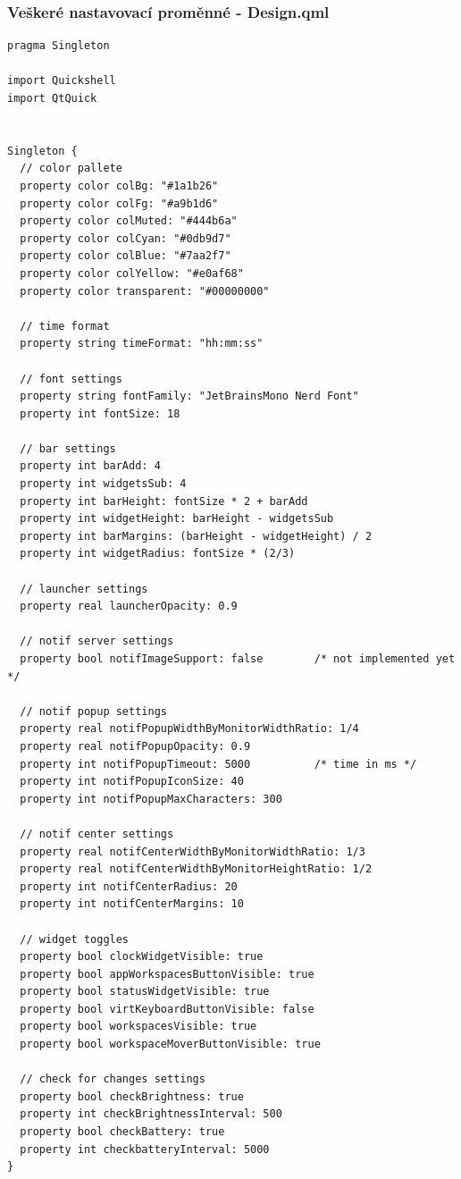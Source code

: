 \documentclass[12pt,a4paper]{article}
\begin{document}
\subsubsection{Veškeré nastavovací proměnné - Design.qml}
\label{Design.qml 0}
\begin{lstlisting}
pragma Singleton

import Quickshell
import QtQuick 


Singleton {
  // color pallete
  property color colBg: "#1a1b26"
  property color colFg: "#a9b1d6"
  property color colMuted: "#444b6a"
  property color colCyan: "#0db9d7"
  property color colBlue: "#7aa2f7"
  property color colYellow: "#e0af68"
  property color transparent: "#00000000"

  // time format
  property string timeFormat: "hh:mm:ss"

  // font settings
  property string fontFamily: "JetBrainsMono Nerd Font"
  property int fontSize: 18

  // bar settings
  property int barAdd: 4
  property int widgetsSub: 4
  property int barHeight: fontSize * 2 + barAdd
  property int widgetHeight: barHeight - widgetsSub
  property int barMargins: (barHeight - widgetHeight) / 2
  property int widgetRadius: fontSize * (2/3)

  // launcher settings
  property real launcherOpacity: 0.9

  // notif server settings
  property bool notifImageSupport: false        /* not implemented yet */

  // notif popup settings
  property real notifPopupWidthByMonitorWidthRatio: 1/4
  property real notifPopupOpacity: 0.9
  property int notifPopupTimeout: 5000          /* time in ms */
  property int notifPopupIconSize: 40
  property int notifPopupMaxCharacters: 300

  // notif center settings
  property real notifCenterWidthByMonitorWidthRatio: 1/3
  property real notifCenterWidthByMonitorHeightRatio: 1/2
  property int notifCenterRadius: 20
  property int notifCenterMargins: 10

  // widget toggles
  property bool clockWidgetVisible: true
  property bool appWorkspacesButtonVisible: true
  property bool statusWidgetVisible: true
  property bool virtKeyboardButtonVisible: false
  property bool workspacesVisible: true
  property bool workspaceMoverButtonVisible: true

  // check for changes settings
  property bool checkBrightness: true
  property int checkBrightnessInterval: 500
  property bool checkBattery: true
  property int checkbatteryInterval: 5000  
}
\end{lstlisting}
\end{document}
